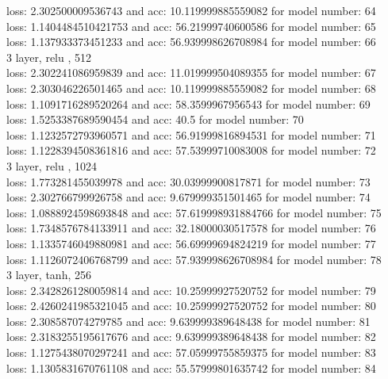 \documentclass{article}
\begin{document}
loss: 2.302500009536743 and acc: 10.119999885559082 for model number: 64 \\
loss: 1.1404484510421753 and acc: 56.21999740600586 for model number: 65 \\
loss: 1.137933373451233 and acc: 56.939998626708984 for model number: 66 \\
3 layer, relu , 512 \\
loss: 2.302241086959839 and acc: 11.019999504089355 for model number: 67 \\
loss: 2.303046226501465 and acc: 10.119999885559082 for model number: 68 \\
loss: 1.1091716289520264 and acc: 58.3599967956543 for model number: 69 \\
loss: 1.5253387689590454 and acc: 40.5 for model number: 70 \\
loss: 1.1232572793960571 and acc: 56.91999816894531 for model number: 71 \\
loss: 1.1228394508361816 and acc: 57.53999710083008 for model number: 72 \\
3 layer, relu , 1024 \\
loss: 1.773281455039978 and acc: 30.03999900817871 for model number: 73 \\
loss: 2.302766799926758 and acc: 9.679999351501465 for model number: 74 \\
loss: 1.0888924598693848 and acc: 57.619998931884766 for model number: 75 \\
loss: 1.7348576784133911 and acc: 32.18000030517578 for model number: 76 \\
loss: 1.1335746049880981 and acc: 56.69999694824219 for model number: 77 \\
loss: 1.1126072406768799 and acc: 57.939998626708984 for model number: 78 \\
3 layer, tanh, 256 \\
loss: 2.3428261280059814 and acc: 10.25999927520752 for model number: 79 \\
loss: 2.4260241985321045 and acc: 10.25999927520752 for model number: 80 \\
loss: 2.308587074279785 and acc: 9.639999389648438 for model number: 81 \\
loss: 2.3183255195617676 and acc: 9.639999389648438 for model number: 82 \\
loss: 1.1275438070297241 and acc: 57.05999755859375 for model number: 83 \\
loss: 1.1305831670761108 and acc: 55.57999801635742 for model number: 84 \\
\end{document}

